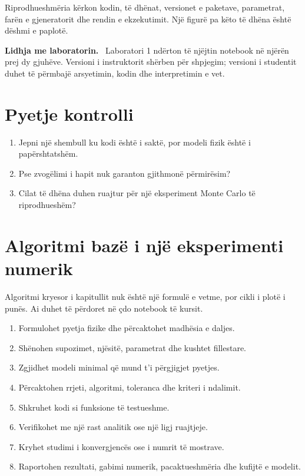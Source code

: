 \documentclass[11pt,oneside,openany]{book}
\newenvironment{lidhje}{\par\medskip\noindent\textbf{Lidhja me laboratorin.}\ }{\par\medskip}
\begin{document}
Riprodhueshmëria kërkon kodin, të dhënat, versionet e paketave, parametrat, farën e gjeneratorit dhe rendin e ekzekutimit. Një figurë pa këto të dhëna është dëshmi e paplotë.

\begin{lidhje}
Laboratori 1 ndërton të njëjtin notebook në njërën prej dy gjuhëve. Versioni i instruktorit shërben për shpjegim; versioni i studentit duhet të përmbajë arsyetimin, kodin dhe interpretimin e vet.
\end{lidhje}

\section*{Pyetje kontrolli}
\begin{enumerate}
\item Jepni një shembull ku kodi është i saktë, por modeli fizik është i papërshtatshëm.
\item Pse zvogëlimi i hapit nuk garanton gjithmonë përmirësim?
\item Cilat të dhëna duhen ruajtur për një eksperiment Monte Carlo të riprodhueshëm?
\end{enumerate}

\section{Algoritmi bazë i një eksperimenti numerik}
Algoritmi kryesor i kapitullit nuk është një formulë e vetme, por cikli i plotë i punës. Ai duhet të përdoret në çdo notebook të kursit.

\begin{enumerate}
\item Formulohet pyetja fizike dhe përcaktohet madhësia e daljes.
\item Shënohen supozimet, njësitë, parametrat dhe kushtet fillestare.
\item Zgjidhet modeli minimal që mund t'i përgjigjet pyetjes.
\item Përcaktohen rrjeti, algoritmi, toleranca dhe kriteri i ndalimit.
\item Shkruhet kodi si funksione të testueshme.
\item Verifikohet me një rast analitik ose një ligj ruajtjeje.
\item Kryhet studimi i konvergjencës ose i numrit të mostrave.
\item Raportohen rezultati, gabimi numerik, pacaktueshmëria dhe kufijtë e modelit.
\end{enumerate}
\end{document}
